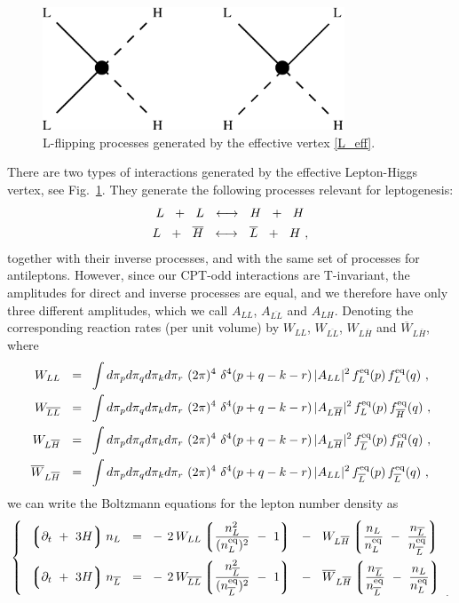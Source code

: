 \documentclass[12pt]{revtex4}
\newcommand{\eq}{{\rm eq}}
\newcommand{\lgr}{\left\lgroup}
\newcommand{\rgr}{\right\rgroup}
\newcommand{\p}{\partial}
\newcommand{\ov}{\overline}
\begin{document}
\begin{figure}
\includegraphics[width=9cm]{lflip.eps}
\caption{L-flipping processes generated by the effective vertex \eqref{L_eff}.}
\label{lflip_fig}
\end{figure}
There are two types of interactions generated by the effective
Lepton-Higgs vertex, see Fig.~\ref{lflip_fig}.
They generate the following processes relevant for leptogenesis:
\begin{align}
\notag
	L~~+~~L ~~\longleftrightarrow~~ H~~+~~H~  \\
\notag
	L~~+~~\ov{H} ~~\longleftrightarrow~~ \ov{L}~~+~~H~,
\end{align}
together with their inverse processes, and with the same set of processes
for antileptons.
However, since our CPT-odd interactions are T-invariant, the amplitudes for
direct and inverse processes are equal, and we therefore have 
only three different amplitudes, which we call  
$ A_{LL} $, $ A_{\ov{LL}} $ and $ A_{LH} $.
Denoting the corresponding reaction rates (per unit volume) by
$ W_{LL} $, $ W_{\ov{LL}} $, $ W_{L\ov{H}} $ and $ \ov{W}_{L\ov{H}} $,
where 
\begin{align*}
	W_{LL}   ~~=~~  &
		\int d\pi_p d\pi_q d\pi_k d\pi_r ~
		(2\pi)^4~ \delta^4 ( p + q - k - r )\,
		| A_{LL} |^2\, f_L^\eq(p)\, f_L^\eq(q)~, \\
	W_{\ov{LL}}   ~~=~~  &
		\int d\pi_p d\pi_q d\pi_k d\pi_r ~
		(2\pi)^4~ \delta^4 ( p + q - k - r )\,
		| A_{L\ov{H}} |^2\, f_L^\eq(p)\, f_{\ov{H}}^\eq(q)~, \\
	W_{L\ov{H}}  ~~=~~  &
		\int d\pi_p d\pi_q d\pi_k d\pi_r ~
		(2\pi)^4~ \delta^4 ( p + q - k - r )\,
		| A_{L\ov{H}} |^2\, f_{\ov{L}}^\eq(p)\, f_H^\eq(q)~, \\
	\ov{W}_{L\ov{H}}  ~~=~~  &
		\int d\pi_p d\pi_q d\pi_k d\pi_r ~
		(2\pi)^4~ \delta^4 ( p + q - k - r )\,
		| A_{LL} |^2\, f_{\ov{L}}^\eq(p)\, f_{\ov{L}}^\eq(q)~,
\end{align*}
	we can write the Boltzmann equations for the lepton number density
	as
\begin{equation*}
\left\{~~
\begin{split}
	\lgr \p_t ~+~ 3H \rgr 
		n_L ~~=~~ &
	-\, 2\, W_{LL} \lgr \frac{n_L^2}{(n_L^\eq)^2} ~-~ 1 \rgr
	~~-~~
	W_{L\ov{H}} \lgr \frac{n_L}{n_L^\eq} ~-~ 
			\frac{n_{\ov{L}}}{n_{\ov{L}}^\eq} \rgr  \\
	\lgr \p_t ~+~ 3H \rgr 
		n_{\ov{L}} ~~=~~ &
	-\, 2\, W_{\ov{LL}} \lgr 
		\frac{n_{\ov{L}}^2}{(n_{\ov{L}}^\eq)^2} ~-~ 1 \rgr
	~~-~~
	\ov{W}_{L\ov{H}} \lgr \frac{n_{\ov{L}}}{n_{\ov{L}}^\eq} ~-~ 
			\frac{n_L}{n_L^\eq} \rgr  \\
\end{split}
\right._{~.}
\end{equation*}
\end{document}
